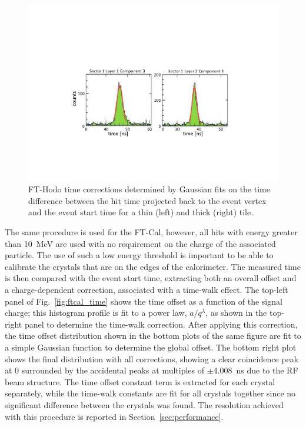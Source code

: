 \begin{figure}
\includegraphics[width=1.0\columnwidth]{fig/fthodo_time.pdf}
\caption{FT-Hodo time corrections determined by Gaussian fits on the time difference between the hit time
  projected back to the event vertex and the event start time for a thin (left) and thick (right) tile.}
\label{fig:fthodo_time}
\end{figure}

The same procedure is used for the FT-Cal, however, all hits with energy greater than 10~MeV are used
with no requirement on the charge of the associated particle. The use of such a low energy threshold is important
to be able to calibrate the crystals that are on the edges of the calorimeter. The measured time is then compared
with the event start time, extracting both an overall offset and a charge-dependent correction, associated with a
time-walk effect. The top-left panel of Fig.~\ref{fig:ftcal_time} shows the time offset as  a function of the
signal charge; this histogram profile is fit to a power law, $a/q^\lambda$, as shown in the top-right panel to
determine the time-walk correction. After applying this correction, the time offset distribution shown in the bottom
plots  of the same figure are fit to a simple Gaussian function to determine the global offset. The bottom right
plot shows the final distribution with all corrections, showing a clear  coincidence peak at 0 surrounded by the
accidental peaks at multiples of $\pm$4.008~ns  due to the RF beam structure. The time offset constant term is
extracted for each crystal separately, while the time-walk constants are fit for all crystals together since no
significant difference between the crystals was found. The resolution achieved with this procedure is reported in
Section~\ref{sec:performance}.

